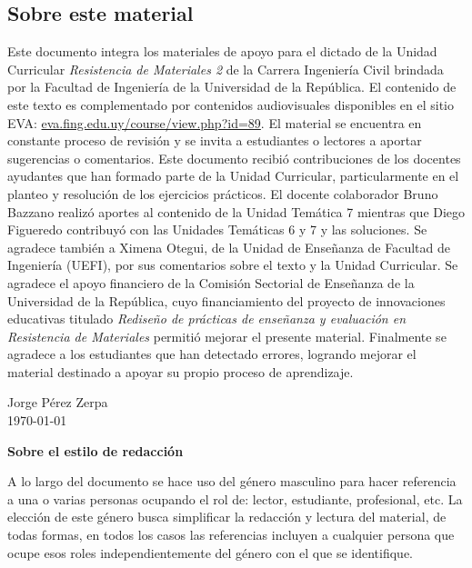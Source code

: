\subsection*{Sobre este material}

Este documento integra los materiales de apoyo para el dictado de la Unidad Curricular \textit{Resistencia de Materiales 2} de la Carrera Ingeniería Civil brindada por la Facultad de Ingeniería de la Universidad de la República. %
%
El contenido de este texto es complementado por contenidos audiovisuales
disponibles en el sitio EVA: \href{https://eva.fing.edu.uy/course/view.php?id=89}{eva.fing.edu.uy/course/view.php?id=89}. %
%
El material se encuentra en constante proceso de revisión y se invita a estudiantes o lectores a aportar sugerencias o comentarios. %
%
Este documento recibió contribuciones de los docentes ayudantes que han formado parte de la Unidad Curricular, particularmente en el planteo y resolución de los ejercicios prácticos. %
%
El docente colaborador Bruno Bazzano realizó aportes al contenido de la Unidad Temática 7 mientras que Diego Figueredo contribuyó con las Unidades Temáticas 6 y 7 y las soluciones. %
%
Se agradece también a Ximena Otegui, de la Unidad de Enseñanza de Facultad de Ingeniería (UEFI), por sus comentarios sobre el texto y la Unidad Curricular. %
%
Se agradece el apoyo financiero de la Comisión Sectorial de Enseñanza de la Universidad de la República, cuyo financiamiento del proyecto de innovaciones educativas titulado \textit{Rediseño de prácticas de enseñanza y evaluación en Resistencia de Materiales} permitió mejorar el presente material. %
%
Finalmente se agradece a los estudiantes que han detectado errores, logrando mejorar el material destinado a apoyar su propio proceso de aprendizaje.

\begin{flushright}
Jorge Pérez Zerpa\\
\today
\end{flushright} 


\vspace{5mm}

\noindent
\textbf{Sobre el estilo de redacción}

A lo largo del documento se hace uso del género masculino para hacer referencia a una o varias personas ocupando el rol de: lector, estudiante, profesional, etc. La elección de este género busca simplificar la redacción y lectura del material, de todas formas, en todos los casos las referencias incluyen a cualquier persona que ocupe esos roles independientemente del género con el que se identifique.


